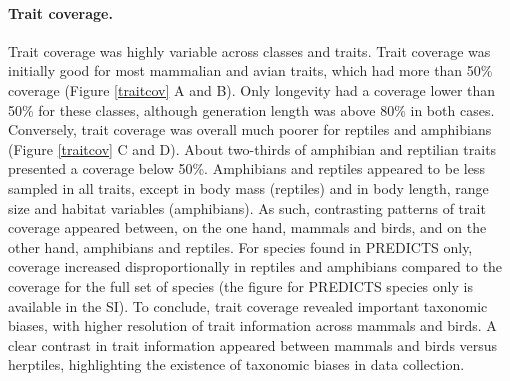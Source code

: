 \paragraph{Trait coverage.}
Trait coverage was highly variable across classes and traits. Trait coverage was initially good for most mammalian and avian traits, which had more than 50\% coverage (Figure \ref{traitcov} A and B). Only longevity had a coverage lower than 50\% for these classes, although generation length was above 80\% in both cases. Conversely, trait coverage was overall much poorer for reptiles and amphibians (Figure \ref{traitcov} C and D). About two-thirds of amphibian and reptilian traits presented a coverage below 50\%.  Amphibians and reptiles appeared to be less sampled in all traits, except in body mass (reptiles) and in body length, range size and habitat variables (amphibians).  As such, contrasting patterns of trait coverage appeared between, on the one hand, mammals and birds, and on the other hand, amphibians and reptiles. For species found in PREDICTS only, coverage increased disproportionally in reptiles and amphibians compared to the coverage for the full set of species (the figure for PREDICTS species only is available in the SI). To conclude, trait coverage revealed important taxonomic biases, with higher resolution of trait information across mammals and birds. A clear contrast in trait information appeared between mammals and birds versus herptiles, highlighting the existence of taxonomic biases in data collection.


